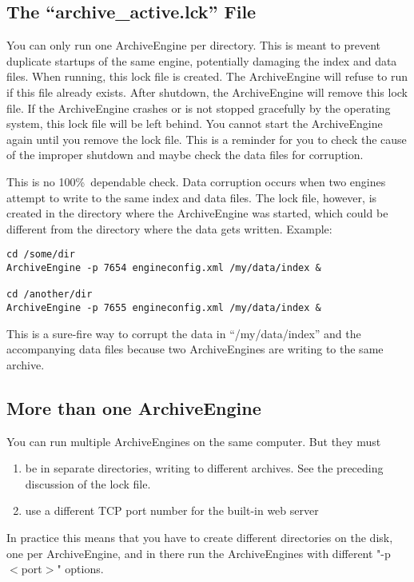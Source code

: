 \subsection{The ``archive\_active.lck'' File}
You can only run one ArchiveEngine per directory. This is meant to
prevent duplicate startups of the same engine, potentially damaging
the index and data files. When running, this lock file is
created. The ArchiveEngine will refuse to run if this file already
exists.  After shutdown, the ArchiveEngine will remove this lock file.
If the ArchiveEngine crashes or is not stopped gracefully by the
operating system, this lock file will be left behind.  You cannot
start the ArchiveEngine again until you remove the lock file. This is
a reminder for you to check the cause of the improper shutdown and
maybe check the data files for corruption.

\NOTE This is no 100\%\ dependable check. Data corruption occurs when
two engines attempt to write to the same index and data files. The
lock file, however, is created in the directory where the
ArchiveEngine was started, which could be different from the directory
where the data gets written. Example:

\begin{lstlisting}[frame=none,keywordstyle=\sffamily]
cd /some/dir
ArchiveEngine -p 7654 engineconfig.xml /my/data/index &

cd /another/dir
ArchiveEngine -p 7655 engineconfig.xml /my/data/index &
\end{lstlisting}

\noindent This is a sure-fire way to corrupt the data in
``/my/data/index'' and the accompanying data files because two
ArchiveEngines are writing to the same archive.

\subsection{More than one ArchiveEngine}
You can run multiple ArchiveEngines on the same
computer. But they must
\begin{enumerate}
\item be in separate directories, writing to different archives.
      See the preceding discussion of the lock file.
\item use a different TCP port number for the built-in web server
\end{enumerate}
In practice this means that you have to create different directories
on the disk, one per ArchiveEngine, and in there run the
ArchiveEngines with different "-p $<$port$>$" options.

